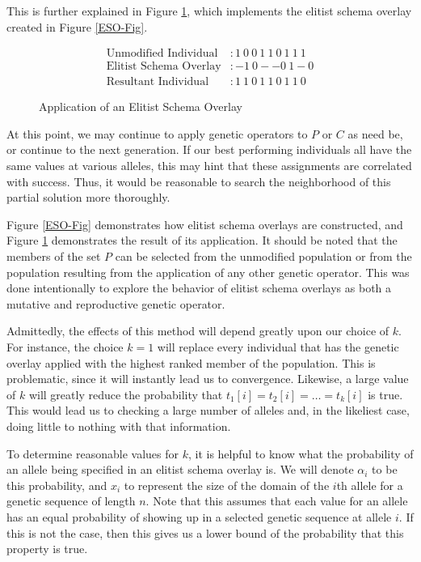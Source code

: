 \noindent This is further explained in Figure \ref{ESO-apl}, which implements the elitist schema overlay created in Figure \ref{ESO-Fig}.

\begin{figure}[h!]
\centering 
\begin{align*}
\text{Unmodified Individual} &: 1~0~0~1~1~0~1~1~1	\\	
\text{Elitist Schema Overlay} &:   -1~0--0~1-0			\\  	
\text{Resultant Individual} &: 1~1~0~1~1~0~1~1~0
\end{align*}
\caption{Application of an Elitist Schema Overlay}
\label{ESO-apl}
\end{figure}

At this point, we may continue to apply genetic operators to $P$ or $C$ as need be, or continue to the next generation. If our best performing individuals all have the same values at various alleles, this may hint that these assignments are correlated with success. Thus, it would be reasonable to search the neighborhood of this partial solution more thoroughly. 

Figure \ref{ESO-Fig} demonstrates how elitist schema overlays are constructed, and Figure \ref{ESO-apl} demonstrates the result of its application. It should be noted that the members of the set $P$ can be selected from the unmodified population or from the population resulting from the application of any other genetic operator. This was done intentionally to explore the behavior of elitist schema overlays as both a mutative and reproductive genetic operator. 

Admittedly, the effects of this method will depend greatly upon our choice of $k$. For instance, the choice $k = 1$ will replace every individual that has the genetic overlay applied with the highest ranked member of the population. This is problematic, since it will instantly lead us to convergence. Likewise, a large value of $k$ will greatly reduce the probability that $t_1[i] = t_2[i] = \ldots = t_k[i]$ is true. This would lead us to checking a large number of alleles and, in the likeliest case, doing little to nothing with that information.

To determine reasonable values for $k$, it is helpful to know what the probability of an allele being specified in an elitist schema overlay is. We will denote $\alpha_i$ to be this probability, and $x_i$ to represent the size of the domain of the $i$th allele for a genetic sequence of length $n$. Note that this assumes that each value for an allele has an equal probability of showing up in a selected genetic sequence at allele $i$. If this is not the case, then this gives us a lower bound of the probability that this property is true.

